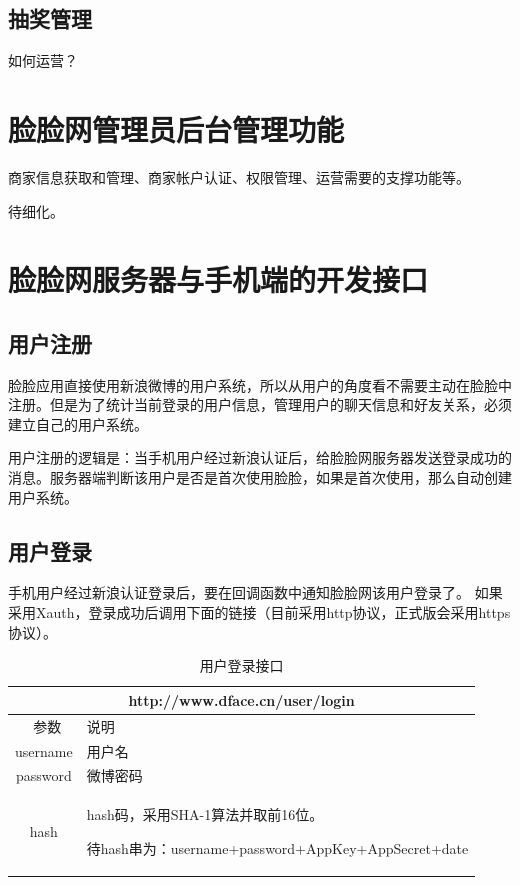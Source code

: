 \documentclass[cs4size]{ctexartutf8}
\begin{document}
\subsection{抽奖管理}
如何运营？


\section{脸脸网管理员后台管理功能}
商家信息获取和管理、商家帐户认证、权限管理、运营需要的支撑功能等。

待细化。



\section{脸脸网服务器与手机端的开发接口}
\subsection{用户注册}
脸脸应用直接使用新浪微博的用户系统，所以从用户的角度看不需要主动在脸脸中注册。但是为了统计当前登录的用户信息，管理用户的聊天信息和好友关系，必须建立自己的用户系统。

用户注册的逻辑是：当手机用户经过新浪认证后，给脸脸网服务器发送登录成功的消息。服务器端判断该用户是否是首次使用脸脸，如果是首次使用，那么自动创建用户系统。

\subsection{用户登录}
手机用户经过新浪认证登录后，要在回调函数中通知脸脸网该用户登录了。
如果采用Xauth，登录成功后调用下面的链接（目前采用http协议，正式版会采用https协议）。



\begin{table}[H]
   \begin{center}
\begin{tabular}{|c|p{12cm}|}
\hline
\multicolumn{2}{|c|}{http://www.dface.cn/user/login} \\
\hline\hline
 \  参数  &  说明  \\
\hline
 username  &  用户名\\
\hline
 password  &  微博密码\\ 
\hline
 hash  &  hash码，采用SHA-1算法并取前16位。
 
  待hash串为：username+password+AppKey+AppSecret+date
  
  \\
\hline
\end{tabular}
\caption{用户登录接口}\label{tab0}
   \end{center}
\end{table}
\end{document}
